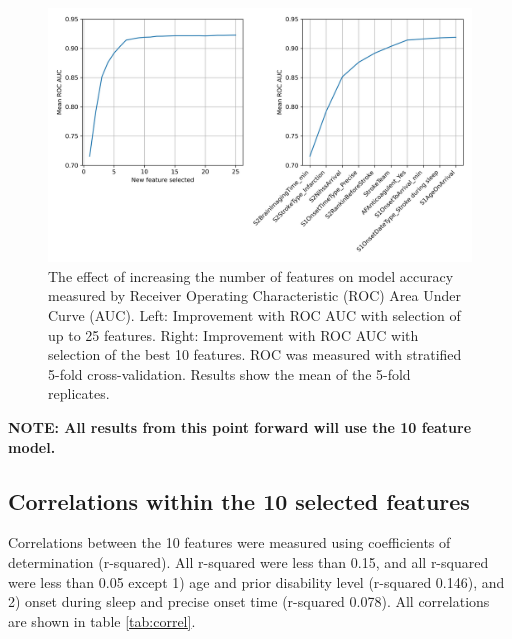 \begin{figure}
\centering
\includegraphics[width=1\textwidth]{./images/01_feature_selection}
\caption{The effect of increasing the number of features on model accuracy measured by Receiver Operating Characteristic (ROC) Area Under Curve (AUC). Left: Improvement with ROC AUC with selection of up to 25 features. Right: Improvement with ROC AUC with selection of the best 10 features. ROC was measured with stratified 5-fold cross-validation. Results show the mean of the 5-fold replicates.}
\label{fig:feature_selection}
\end{figure}


\vspace{5mm}

\begin{center}
    \textbf{\large{NOTE: All results from this point forward will use the 10 feature model.}}
\end{center}





\subsection{Correlations within the 10 selected features}

Correlations between the 10 features were measured using coefficients of determination (r-squared). All r-squared were less than 0.15, and all r-squared were less than 0.05 except 1) age and prior disability level (r-squared 0.146), and 2) onset during sleep and precise onset time (r-squared 0.078). All correlations are shown in table \ref{tab:correl}.



